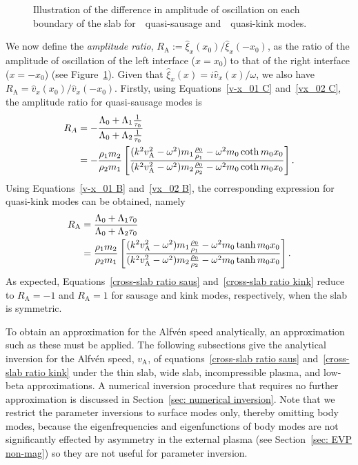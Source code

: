 \documentclass[12pt]{../style-files/ociamthesis}
\begin{document}
\begin{figure}
{{{ 
			}\label{fig: RA kink}}}
	\caption{Illustration of the difference in amplitude of oscillation on each boundary of the slab for~\protect{}~quasi-sausage and~\protect{}~quasi-kink modes.}
	\label{fig: RA}
\end{figure}

We now define the \emph{amplitude ratio}, $R_\textrm{A} := \hat{\xi}_x(x_0) / \hat{\xi}_x(-x_0)$, as the ratio of the amplitude of oscillation of the left interface ($x = x_0$) to that of the right interface ($x = -x_0$) (see Figure~\ref{fig: RA}). Given that ${\hat{\xi}_x(x) = i\hat{v}_x(x) / \omega}$, we also have $R_\textrm{A} = \hat{v}_x(x_0) / \hat{v}_x(-x_0)$. Firstly, using Equations~\eqref{v-x_01 C} and~\eqref{vx_02 C}, the amplitude ratio for quasi-sausage modes is
\begin{align}
R_A &= -\frac{\Lambda_0 + \Lambda_1\frac{1}{\tau_0}}{\Lambda_0 + \Lambda_2\frac{1}{\tau_0}} \notag \\
&= -\frac{\rho_1m_2}{\rho_2m_1}\left[\frac{(k^2v_\textrm{A}^2 - \omega^2)m_1\frac{\rho_0}{\rho_1} - \omega^2m_0\coth{m_0x_0}}{(k^2v_\textrm{A}^2 - \omega^2)m_2\frac{\rho_0}{\rho_2} - \omega^2m_0\coth{m_0x_0}}\right]. \label{cross-slab ratio saus}
\end{align}
Using Equations~\eqref{v-x_01 B} and~\eqref{vx_02 B}, the corresponding expression for quasi-kink modes can be obtained, namely
\begin{align}
R_\textrm{A} &= \frac{\Lambda_0 + \Lambda_1\tau_0}{\Lambda_0 + \Lambda_2\tau_0} \notag \\
&= \frac{\rho_1m_2}{\rho_2m_1}\left[\frac{(k^2v_\textrm{A}^2 - \omega^2)m_1\frac{\rho_0}{\rho_1} - \omega^2m_0\tanh{m_0x_0}}{(k^2v_\textrm{A}^2 - \omega^2)m_2\frac{\rho_0}{\rho_2} - \omega^2m_0\tanh{m_0x_0}}\right]. \label{cross-slab ratio kink}
\end{align}
As expected, Equations~\eqref{cross-slab ratio saus} and~\eqref{cross-slab ratio kink} reduce to $R_\textrm{A} = -1$ and $R_\textrm{A} = 1$ for sausage and kink modes, respectively, when the slab is symmetric.

To obtain an approximation for the Alfv\'{e}n speed analytically, an approximation such as these must be applied. The following subsections give the analytical inversion for the Alfv\'{e}n speed, $v_\textrm{A}$, of equations~\eqref{cross-slab ratio saus} and~\eqref{cross-slab ratio kink} under the thin slab, wide slab, incompressible plasma, and low-beta approximations. A numerical inversion procedure that requires no further approximation is discussed in Section~\ref{sec: numerical inversion}. Note that we restrict the parameter inversions to surface modes only, thereby omitting body modes, because the eigenfrequencies and eigenfunctions of body modes are not significantly effected by asymmetry in the external plasma (see Section~\ref{sec: EVP non-mag}) so they are not useful for parameter inversion.
\end{document}
